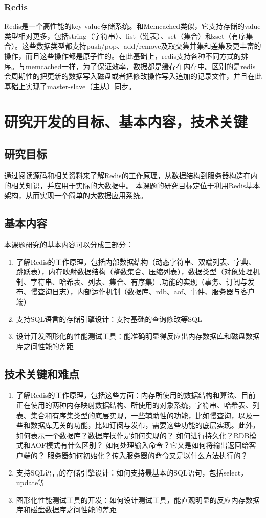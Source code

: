 \documentclass[proposal]{zjutreport}
\begin{document}
\subsection{Redis}
Redis是一个高性能的key-value存储系统。和Memcached类似，它支持存储的value类型相对更多，包括string（字符串）、list（链表）、set（集合）和zset（有序集合）。这些数据类型都支持push/pop、add/remove及取交集并集和差集及更丰富的操作，而且这些操作都是原子性的。在此基础上，redis支持各种不同方式的排序。与memcached一样，为了保证效率，数据都是缓存在内存中。区别的是redis会周期性的把更新的数据写入磁盘或者把修改操作写入追加的记录文件，并且在此基础上实现了master-slave（主从）同步。

\chapter{研究开发的目标、基本内容，技术关键}
\section{研究目标}
通过阅读源码和相关资料来了解Redis的工作原理，从数据结构到服务器构造在内的相关知识，并应用于实际的大数据中。
本课题的研究目标定位于利用Redis基本架构，从而实现一个简单的大数据应用系统。

\section{基本内容}
本课题研究的基本内容可以分成三部分：
\begin{enumerate}[label=（\arabic*）]
\item{了解Redis的工作原理，包括内部数据结构（动态字符串、双端列表、字典、跳跃表），内存映射数据结构（整数集合、压缩列表），数据类型（对象处理机制、字符串、哈希表、列表、集合、有序集）,功能的实现（事务、订阅与发布、慢查询日志），内部运作机制（数据库、rdb、aof、事件、服务器与客户端）
}
\item{支持SQL语言的存储引擎设计：支持基础的查询修改等SQL}
\item{设计开发图形化的性能测试工具：能准确明显得反应出内存数据库和磁盘数据库之间性能的差距}
\end{enumerate}

\section{技术关键和难点}
\begin{enumerate}[label=（\arabic*）]
\item{了解Redis的工作原理，包括这些方面：内存所使用的数据结构和算法、目前正在使用的两种内存映射数据结构、所使用的对象系统，字符串、哈希表、列表、集合和有序集类型的底层实现，一些辅助性的功能，比如慢查询，以及一些和数据库无关的功能，比如订阅与发布，需要这些功能的底层实现。此外，如何表示一个数据库？数据库操作是如何实现的？
如何进行持久化？RDB模式和AOF模式有什么区别？
如何处理输入命令？它又是如何将输出返回给客户端的？
服务器如何初始化？传入服务器的命令又是以什么方法执行的？}
\item{支持SQL语言的存储引擎设计：如何支持最基本的SQL语句，包括select，update等}
\item{图形化性能测试工具的开发：如何设计测试工具，能直观明显的反应内存数据库和磁盘数据库之间性能的差距}
\end{enumerate}
\end{document}
